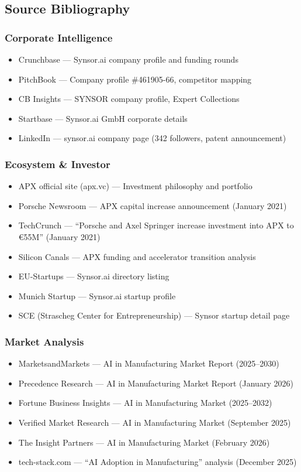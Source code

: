 \documentclass[11pt,letterpaper]{article}
\begin{document}
\subsection{Source Bibliography}

\subsubsection*{Corporate Intelligence}
\begin{itemize}[leftmargin=2em]
  \item Crunchbase --- Synsor.ai company profile and funding rounds
  \item PitchBook --- Company profile \#461905-66, competitor mapping
  \item CB Insights --- SYNSOR company profile, Expert Collections
  \item Startbase --- Synsor.ai GmbH corporate details
  \item LinkedIn --- synsor.ai company page (342 followers, patent announcement)
\end{itemize}

\subsubsection*{Ecosystem \& Investor}
\begin{itemize}[leftmargin=2em]
  \item APX official site (apx.vc) --- Investment philosophy and portfolio
  \item Porsche Newsroom --- APX capital increase announcement (January 2021)
  \item TechCrunch --- ``Porsche and Axel Springer increase investment into APX to \euro55M'' (January 2021)
  \item Silicon Canals --- APX funding and accelerator transition analysis
  \item EU-Startups --- Synsor.ai directory listing
  \item Munich Startup --- Synsor.ai startup profile
  \item SCE (Strascheg Center for Entrepreneurship) --- Synsor startup detail page
\end{itemize}

\subsubsection*{Market Analysis}
\begin{itemize}[leftmargin=2em]
  \item MarketsandMarkets --- AI in Manufacturing Market Report (2025--2030)
  \item Precedence Research --- AI in Manufacturing Market Report (January 2026)
  \item Fortune Business Insights --- AI in Manufacturing Market (2025--2032)
  \item Verified Market Research --- AI in Manufacturing Market (September 2025)
  \item The Insight Partners --- AI in Manufacturing Market (February 2026)
  \item tech-stack.com --- ``AI Adoption in Manufacturing'' analysis (December 2025)
\end{itemize}
\end{document}
